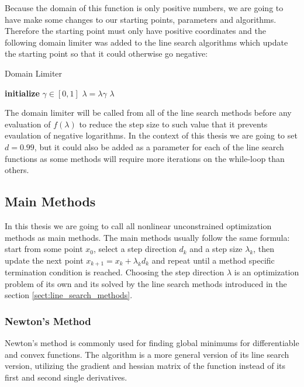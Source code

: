 \documentclass[a4paper,english,titlepage,12pt]{article}
\newcommand{\vect}[1]{\ensuremath{\mathbf{#1}}}
\begin{document}
Because the domain of this function is only positive numbers, we are going to have make some changes to our starting points, parameters and algorithms. Therefore the starting point must only have positive coordinates and the following domain limiter was added to the line search algorithms which update the starting point so that it could otherwise go negative:

\begin{algorithm}[H]
\caption{Domain Limiter}
\label{alg:domain_limiter}
\begin{algorithmic}[1]
\STATE \textbf{initialize} $\gamma \in [0, 1]$
\WHILE{min $(\vect{x} + \lambda \vect{d}) <= 0$}
    \STATE $\lambda = \lambda \gamma$
\ENDWHILE
\RETURN $\lambda$
\end{algorithmic}
\end{algorithm}

The domain limiter will be called from all of the line search methods before any evaluation of $f(\lambda)$ to reduce the step size to such value that it prevents evaulation of negative logarithms. In the context of this thesis we are going to set $d = 0.99$, but it could also be added as a parameter for each of the line search functions as some methods will require more iterations on the while-loop than others.


\subsection{Main Methods}


In this thesis we are going to call all nonlinear unconstrained optimization methods as main methods. The main methods usually follow the same formula: start from some point $x_0$, select a step direction $d_k$ and a step size $\lambda_k$, then update the next point $x_{k + 1} = x_k + \lambda_k d_k$ and repeat until a method specific termination condition is reached. Choosing the step direction $\lambda$ is an optimization problem of its own and its solved by the line search methods introduced in the section \ref{sect:line_search_methods}. \cite{book:nonlinear_programming}


\subsubsection{Newton's Method}


Newton's method is  commonly used for finding global minimums for differentiable and convex functions. The algorithm is a more general version of its line search version, utilizing the gradient and hessian matrix of the function instead of its first and second single derivatives.
\end{document}
